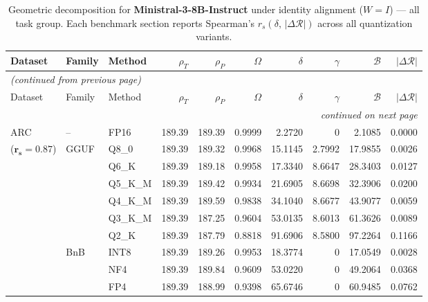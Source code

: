 \begingroup
\small
\setlength{\tabcolsep}{4pt}
\renewcommand{\arraystretch}{1.05}
\setlength{\LTcapwidth}{\textwidth}
\begin{longtable}{ll l rrrrrrr}
\caption{Geometric decomposition for \textbf{Ministral-3-8B-Instruct} under identity alignment ($W{=}I$) --- all task group. Each benchmark section reports Spearman's $r_s(\delta,\,|\Delta\mathcal{R}|)$ across all quantization variants.}\label{tab:mistral_instruct_decomposition_all}\\
\toprule
Dataset & Family & Method & $\rho_T$ & $\rho_P$ & $\Omega$ & $\delta$ & $\gamma$ & $\mathcal{B}$ & $|\Delta\mathcal{R}|$ \\
\midrule
\endfirsthead
\multicolumn{10}{l}{\small\itshape (continued from previous page)}\\
\toprule
Dataset & Family & Method & $\rho_T$ & $\rho_P$ & $\Omega$ & $\delta$ & $\gamma$ & $\mathcal{B}$ & $|\Delta\mathcal{R}|$ \\
\midrule
\endhead
\midrule
\multicolumn{10}{r}{\small\itshape continued on next page}\\
\endfoot
\bottomrule
\endlastfoot
ARC & -- & FP16 & 189.39 & 189.39 & 0.9999 & 2.2720 & \cellcolor{cyan!12} $0$ & 2.1085 & 0.0000 \\
{\small ($\mathbf{r_s{=}0.87}$)} & GGUF & Q8\_0 & 189.39 & 189.32 & 0.9968 & 15.1145 & 2.7992 & 17.9855 & 0.0026 \\
 &  & Q6\_K & 189.39 & 189.18 & 0.9958 & 17.3340 & 8.6647 & 28.3403 & 0.0127 \\
 &  & Q5\_K\_M & 189.39 & 189.42 & 0.9934 & 21.6905 & 8.6698 & 32.3906 & 0.0200 \\
 &  & Q4\_K\_M & 189.39 & 189.59 & 0.9838 & 34.1040 & 8.6677 & 43.9077 & 0.0059 \\
 &  & Q3\_K\_M & 189.39 & 187.25 & 0.9604 & 53.0135 & 8.6013 & 61.3626 & 0.0089 \\
 &  & Q2\_K & 189.39 & 187.79 & \cellcolor{red!18} 0.8818 & \cellcolor{red!18} 91.6906 & 8.5800 & \cellcolor{red!18} 97.2264 & \cellcolor{red!18} 0.1166 \\
 & BnB & INT8 & 189.39 & 189.26 & 0.9953 & 18.3774 & \cellcolor{cyan!12} $0$ & 17.0549 & 0.0028 \\
 &  & NF4 & 189.39 & 189.84 & 0.9609 & 53.0220 & \cellcolor{cyan!12} $0$ & 49.2064 & 0.0368 \\
 &  & FP4 & 189.39 & 188.99 & \cellcolor{red!18} 0.9398 & \cellcolor{red!18} 65.6746 & \cellcolor{cyan!12} $0$ & \cellcolor{red!18} 60.9485 & \cellcolor{red!18} 0.0762 \\

\end{longtable}
